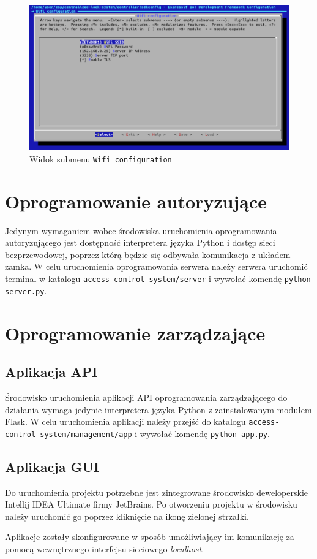         \begin{figure}[]
            \centering
            \includegraphics[width=\textwidth]{chapters/images/menuconfig2.png}
            \caption{Widok submenu \texttt{Wifi configuration}}
            \label{fig:men2}
        \end{figure}

\section{Oprogramowanie autoryzujące}
    Jedynym wymaganiem wobec środowiska uruchomienia oprogramowania autoryzującego jest dostępność interpretera języka Python i dostęp sieci bezprzewodowej, poprzez którą będzie się odbywała komunikacja z układem zamka.
    W celu uruchomienia oprogramowania serwera należy serwera uruchomić terminal w katalogu \texttt{access-control-system/server} i wywołać komendę \texttt{python server.py}.

\section{Oprogramowanie zarządzające}

\subsection{Aplikacja API}
        Środowisko uruchomienia aplikacji API oprogramowania zarządzającego do działania wymaga jedynie interpretera języka Python z zainstalowanym modułem Flask. W celu uruchomienia aplikacji należy przejść do katalogu \texttt{access-control-system/management/app} i wywołać komendę \texttt{python app.py}.

\subsection{Aplikacja GUI}
        Do uruchomienia projektu potrzebne jest zintegrowane środowisko deweloperskie Intellij IDEA Ultimate firmy JetBrains. Po otworzeniu projektu w środowisku należy uruchomić go poprzez kliknięcie na ikonę zielonej strzałki.

Aplikacje zostały skonfigurowane w sposób umożliwiający im komunikację za pomocą wewnętrznego interfejsu sieciowego \textit{localhost}.



